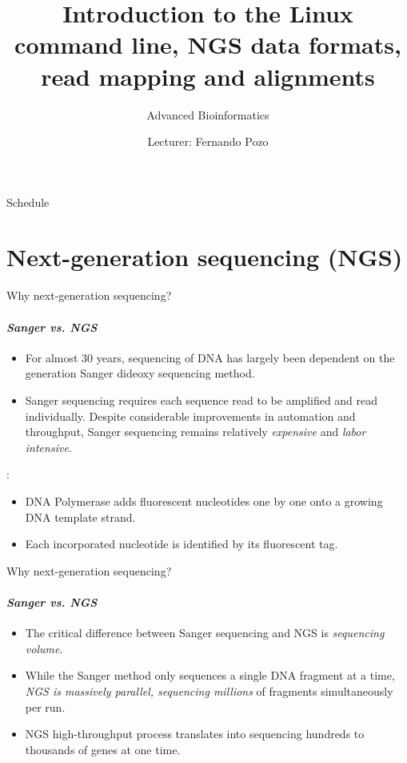 \documentclass{if-beamer}
\title[Advanced Bioinformatics]{Introduction to the Linux command line, NGS data formats, read mapping and alignments}
\subtitle{Advanced Bioinformatics}
\author{Lecturer: Fernando Pozo} \
\institute[UFV]{
  \begin{normalsize}
  \href{mailto:fpozoc@cnio.es}{fpozoc@cnio.es}
  \end{normalsize}
\\~\\
  Bioinformatics Unit, \\
  Spanish National Cancer Research Centre (CNIO) 
}
\date{\displaydate{date}}
\begin{document}
\begin{frame}
  \titlepage
\end{frame}

\begin{frame}{Schedule}
  \tableofcontents
\end{frame}


\section{Next-generation sequencing (NGS)}
\begin{frame}{Why next-generation sequencing?}
\framesubtitle{\emph{Sanger vs. NGS}}
\begin{large}
\begin{itemize}
    \item For almost 30 years, sequencing of DNA has largely been dependent on the  generation Sanger dideoxy sequencing method. 
    \item Sanger sequencing requires each sequence read to be amplified and read individually. Despite considerable improvements in automation and throughput, Sanger sequencing remains relatively \emph{expensive} and \emph{labor intensive}.
    \end{itemize}
:
\begin{itemize}
    \item DNA Polymerase adds fluorescent nucleotides one by one onto a growing DNA template strand. 
    \item Each incorporated nucleotide is identified by its fluorescent tag.
\end{itemize}
\end{large}
\end{frame}
\begin{frame}{Why next-generation sequencing?}
\framesubtitle{\emph{Sanger vs. NGS}}
\begin{large}
\begin{itemize}
    \item The critical difference between Sanger sequencing and NGS is \emph{sequencing volume}.
    \item While the Sanger method only sequences a single DNA fragment at a time, \emph{NGS is massively parallel, sequencing millions} of fragments simultaneously per run. 
    \item NGS high-throughput process translates into sequencing hundreds to thousands of genes at one time.
\end{itemize}
\end{large}
\end{frame}
\end{document}
